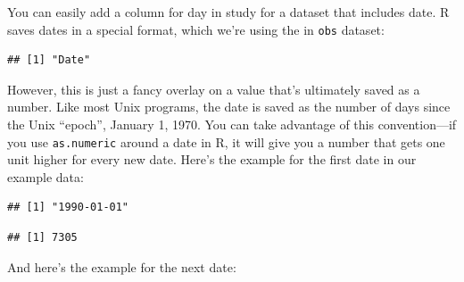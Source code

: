 \documentclass[
]{book}
\newenvironment{Shaded}{\begin{snugshade}}{\end{snugshade}}
\newcommand{\DecValTok}[1]{\textcolor[rgb]{0.00,0.00,0.81}{#1}}
\newcommand{\KeywordTok}[1]{\textcolor[rgb]{0.13,0.29,0.53}{\textbf{#1}}}
\newcommand{\NormalTok}[1]{#1}
\newcommand{\OperatorTok}[1]{\textcolor[rgb]{0.81,0.36,0.00}{\textbf{#1}}}
\begin{document}
You can easily add a column for day in study for a dataset that
includes date. R saves dates in a special format, which we're using the in
\texttt{obs} dataset:

\begin{Shaded}
\end{Shaded}

\begin{verbatim}
## [1] "Date"
\end{verbatim}

However, this is just a fancy overlay on a value that's ultimately saved as
a number. Like most Unix programs, the date is saved as the number of days
since the Unix ``epoch'', January 1, 1970. You can take advantage of this
convention---if you use \texttt{as.numeric} around a date in R, it will give you a
number that gets one unit higher for every new date. Here's the example for
the first date in our example data:

\begin{Shaded}
\end{Shaded}

\begin{verbatim}
## [1] "1990-01-01"
\end{verbatim}

\begin{Shaded}
\end{Shaded}

\begin{verbatim}
## [1] 7305
\end{verbatim}

And here's the example for the next date:

\begin{Shaded}
\end{Shaded}
\end{document}
